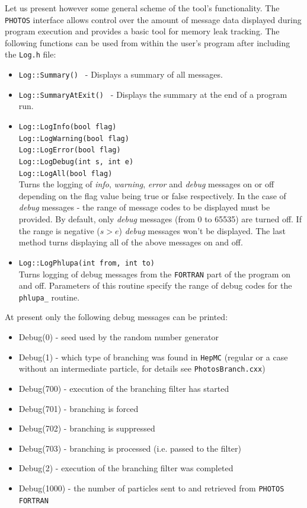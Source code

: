 \documentclass[]{Photos_interface_design}
\begin{document}
Let us present however some general scheme of the tool's
functionality.  The {\tt PHOTOS} interface allows control over the
amount of message data displayed during program execution and
provides a basic tool for memory leak tracking. The following
functions can be used from within the user's program after including the
{\tt Log.h} file:
\begin{itemize}
  \item {\tt Log::Summary() } - Displays a summary of all messages.
  \item {\tt Log::SummaryAtExit() } - Displays the summary at the end of a program run.
  \item {\tt Log::LogInfo(bool flag) } \\
        {\tt Log::LogWarning(bool flag) } \\
        {\tt Log::LogError(bool flag) } \\
        {\tt Log::LogDebug(int s, int e) } \\
        {\tt Log::LogAll(bool flag)} \\
        Turns the logging of \textit{info}, \textit{warning}, \textit{error} and \textit{debug} messages on or off depending
        on the flag value being true or false respectively. In the case of \textit{debug} messages - the range of message codes
        to be displayed must be provided. By default, only \textit{debug} messages
        (from 0 to 65535) are turned off. If the range is negative ($s>e$) \textit{debug} messages
        won't be displayed. The last method turns displaying all of the above messages on and off.
  \item {\tt Log::LogPhlupa(int from, int to) } \\
        Turns logging of debug messages from the {\tt FORTRAN} part of the program on and off.
        Parameters of this routine specify the range of debug codes for the {\tt phlupa\_} routine.
\end{itemize}

At present only the following debug messages can be printed:
\begin{itemize}
  \item Debug(0)    - seed used by the random number generator
  \item Debug(1)    - which type of branching was found in {\tt HepMC}
                     (regular or a case without an intermediate particle, for details see {\tt PhotosBranch.cxx})
  \item Debug(700)  - execution of the branching filter has started
  \item Debug(701)  - branching is forced
  \item Debug(702)  - branching is suppressed
  \item Debug(703)  - branching is processed (i.e. passed to the filter)
  \item Debug(2)    - execution of the branching filter was completed
  \item Debug(1000) - the number of particles sent to and retrieved from {\tt PHOTOS FORTRAN}
\end{itemize}
 
\end{document}
